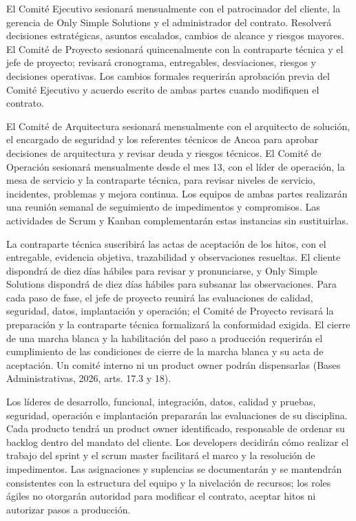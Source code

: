 \documentclass[11pt]{article}
\begin{document}
El Comité Ejecutivo sesionará mensualmente con el patrocinador del
cliente, la gerencia de Only Simple Solutions y el administrador del
contrato. Resolverá decisiones estratégicas, asuntos escalados, cambios
de alcance y riesgos mayores. El Comité de Proyecto sesionará
quincenalmente con la contraparte técnica y el jefe de proyecto;
revisará cronograma, entregables, desviaciones, riesgos y decisiones
operativas. Los cambios formales requerirán aprobación previa del Comité
Ejecutivo y acuerdo escrito de ambas partes cuando modifiquen el
contrato.

El Comité de Arquitectura sesionará mensualmente con el arquitecto de
solución, el encargado de seguridad y los referentes técnicos de Ancoa
para aprobar decisiones de arquitectura y revisar deuda y riesgos
técnicos. El Comité de Operación sesionará mensualmente desde el mes 13,
con el líder de operación, la mesa de servicio y la contraparte técnica,
para revisar niveles de servicio, incidentes, problemas y mejora
continua. Los equipos de ambas partes realizarán una reunión semanal de
seguimiento de impedimentos y compromisos. Las actividades de Scrum y
Kanban complementarán estas instancias sin sustituirlas.

La contraparte técnica suscribirá las actas de aceptación de los hitos,
con el entregable, evidencia objetiva, trazabilidad y observaciones
resueltas. El cliente dispondrá de diez días hábiles para revisar y
pronunciarse, y Only Simple Solutions dispondrá de diez días hábiles
para subsanar las observaciones. Para cada paso de fase, el jefe de
proyecto reunirá las evaluaciones de calidad, seguridad, datos,
implantación y operación; el Comité de Proyecto revisará la preparación
y la contraparte técnica formalizará la conformidad exigida. El cierre
de una marcha blanca y la habilitación del paso a producción requerirán
el cumplimiento de las condiciones de cierre de la marcha blanca y su
acta de aceptación. Un comité interno ni un product owner podrán
dispensarlas (Bases Administrativas, 2026, arts. 17.3 y 18).

Los líderes de desarrollo, funcional, integración, datos, calidad y
pruebas, seguridad, operación e implantación prepararán las evaluaciones
de su disciplina. Cada producto tendrá un product owner identificado,
responsable de ordenar su backlog dentro del mandato del cliente. Los
developers decidirán cómo realizar el trabajo del sprint y el scrum
master facilitará el marco y la resolución de impedimentos. Las
asignaciones y suplencias se documentarán y se mantendrán consistentes
con la estructura del equipo y la nivelación de recursos; los roles
ágiles no otorgarán autoridad para modificar el contrato, aceptar hitos
ni autorizar pasos a producción.
\end{document}
